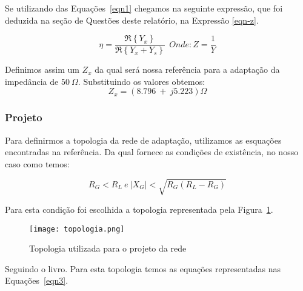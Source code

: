 \documentclass[a4paper,12pt]{proc}
\begin{document}
\noindent Se utilizando das Equações~\ref{eqn1} chegamos na seguinte expressão, que foi deduzida na seção de Questões deste relatório, na Expressão \ref{eqn-z}.

\[\eta = \frac{\Re\left \{ Y_{x} \right \}}{\Re\left \{ Y_{x} + Y_{s} \right \}} ~~ Onde: Z = \frac{1}{Y}\]

\begin{comment}

\[\eta = \frac{\Re \left \{ Y_{x}\right \}\Re \left \{Y_{x}+Y_{s}\right \}}{\left\lVert Y_{x} + Y_{s}\right\rVert } ~~ Onde: Z = \frac{1}{Y}\]


\noindent Considerando a máxima tranferência onde
$\Im \left \{ Y_{z} \right \}  = - \Im \left \{ Y_{s} \right \}$, temos então a Expressão \ref{max_tranf}.

\begin{equation}
    \eta = \frac{\Re\left \{Y_{x}\right\}}{\Re\left \{ Y_{x} + Y_{s} \right \}}
    \label{max_tranf}
\end{equation}
\end{comment}

\noindent Definimos assim um $Z_{x}$ da qual será nossa referência para a adaptação da impedância de $50~\Omega$. Substituindo os valores obtemos: 
\[Z_{x} =  (8.796~+~j5.223)\Omega \]

\subsubsection{Projeto}

Para definirmos a topologia da rede de adaptação, utilizamos as esquações encontradas na referência\cite{Orfanidis2003}.
Da qual fornece as condições de existência, no nosso caso como temos:

\[R_{G}<R_{L}~e~\left\lvert X_{G} \right\rvert <\sqrt{R_{G}(R_{L}-R_{G})}\] 

\noindent Para esta condição foi escolhida a topologia representada pela Figura~\ref{topo}.

\begin{figure}[htbp]
    \centering
    \texttt{[image: topologia.png]}
    \caption{Topologia utilizada para o projeto da rede}
    \label{topo}
\end{figure}

\noindent Seguindo o livro\cite{Orfanidis2003}. 
Para esta topologia temos as equações representadas nas Equações~\ref{eqn3}.
\end{document}
